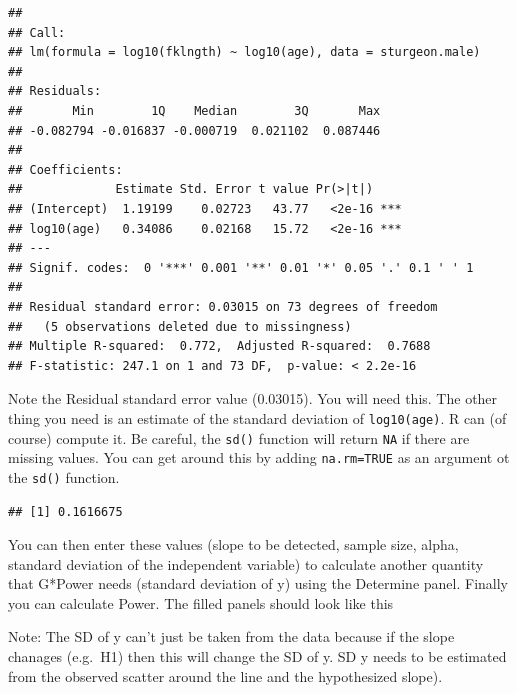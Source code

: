 \documentclass[
  12pt,
]{book}
\makeatletter
\newenvironment{Shaded}{\begin{snugshade}}{\end{snugshade}}
\newcommand{\DataTypeTok}[1]{\textcolor[rgb]{0.13,0.29,0.53}{#1}}
\newcommand{\KeywordTok}[1]{\textcolor[rgb]{0.13,0.29,0.53}{\textbf{#1}}}
\newcommand{\NormalTok}[1]{#1}
\newcommand{\OperatorTok}[1]{\textcolor[rgb]{0.81,0.36,0.00}{\textbf{#1}}}
\newcommand{\OtherTok}[1]{\textcolor[rgb]{0.56,0.35,0.01}{#1}}
\newenvironment{kframe}{%
\medskip{}
\setlength{\fboxsep}{.8em}
\def\at@end@of@kframe{}%
\ifinner\ifhmode%
 \def\at@end@of@kframe{\end{minipage}}%
 \begin{minipage}{\columnwidth}%
\fi\fi%
\def\FrameCommand##1{\hskip\@totalleftmargin \hskip-\fboxsep
\colorbox{incolor}{##1}\hskip-\fboxsep
    \hskip-\linewidth \hskip-\@totalleftmargin \hskip\columnwidth}%
\MakeFramed {\advance\hsize-\width
  \@totalleftmargin\z@ \linewidth\hsize
  \@setminipage}}%
{\par\unskip\endMakeFramed%
\at@end@of@kframe}
\newenvironment{rmdblock}[1]
 {
 \begin{itemize}
 \renewcommand{\labelitemi}{
   \raisebox{-.7\height}[0pt][0pt]{
     {\setkeys{Gin}{width=3em,keepaspectratio}\texttt{[image: images/\#1]}}
   }
 }
 \begin{kframe}
 \setlength{\fboxsep}{1em}
 \item
 }
 {
 \end{kframe}
 \end{itemize}
 }
\newenvironment{rmdnote}
  {\begin{rmdblock}{note}}
  {\end{rmdblock}}
\makeatother
\begin{document}
\begin{verbatim}
## 
## Call:
## lm(formula = log10(fklngth) ~ log10(age), data = sturgeon.male)
## 
## Residuals:
##       Min        1Q    Median        3Q       Max 
## -0.082794 -0.016837 -0.000719  0.021102  0.087446 
## 
## Coefficients:
##             Estimate Std. Error t value Pr(>|t|)    
## (Intercept)  1.19199    0.02723   43.77   <2e-16 ***
## log10(age)   0.34086    0.02168   15.72   <2e-16 ***
## ---
## Signif. codes:  0 '***' 0.001 '**' 0.01 '*' 0.05 '.' 0.1 ' ' 1
## 
## Residual standard error: 0.03015 on 73 degrees of freedom
##   (5 observations deleted due to missingness)
## Multiple R-squared:  0.772,  Adjusted R-squared:  0.7688 
## F-statistic: 247.1 on 1 and 73 DF,  p-value: < 2.2e-16
\end{verbatim}

Note the Residual standard error value (0.03015). You will need this.
The other thing you need is an estimate of the standard deviation of \texttt{log10(age)}.
R can (of course) compute it. Be careful, the \texttt{sd()} function will return \texttt{NA} if there are missing values. You can get around this by adding \texttt{na.rm=TRUE} as an argument ot the \texttt{sd()} function.

\begin{Shaded}
\end{Shaded}

\begin{verbatim}
## [1] 0.1616675
\end{verbatim}

You can then enter these values (slope to be detected, sample size, alpha, standard deviation of the independent variable) to calculate another quantity that G*Power needs (standard deviation of y) using the Determine panel. Finally you can calculate Power. The filled panels should look like this

\begin{rmdnote}
Note: The SD of y can't just be taken from the data because if the slope
chanages (e.g.~H1) then this will change the SD of y. SD y needs to be
estimated from the observed scatter around the line and the
hypothesized slope).
\end{rmdnote}
\end{document}
